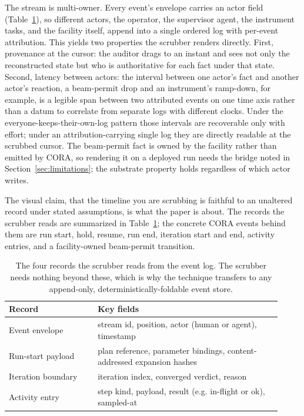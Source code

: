 The stream is multi-owner. Every event's envelope carries an actor field
(Table~\ref{tab:schema}), so different actors, the operator, the supervisor
agent, the instrument tasks, and the facility itself, append into a single
ordered log with per-event attribution. This yields two properties the scrubber
renders directly. First, provenance at the cursor: the auditor drags to an
instant and sees not only the reconstructed state but who is authoritative for
each fact under that state. Second, latency between actors: the interval between
one actor's fact and another actor's reaction, a beam-permit drop and an
instrument's ramp-down, for example, is a legible span between two attributed
events on one time axis rather than a datum to correlate from separate logs with
different clocks. Under the everyone-keeps-their-own-log pattern those intervals
are recoverable only with effort; under an attribution-carrying single log they
are directly readable at the scrubbed cursor. The beam-permit fact is owned by
the facility rather than emitted by CORA, so rendering it on a deployed run needs
the bridge noted in Section~\ref{sec:limitations}; the substrate property holds
regardless of which actor writes.

The visual claim, that the timeline you are scrubbing is faithful to an
unaltered record under stated assumptions, is what the paper is about. The
records the scrubber reads are summarized in Table~\ref{tab:schema}; the
concrete CORA events behind them are run start, hold, resume, run end, iteration
start and end, activity entries, and a facility-owned beam-permit transition.

\begin{table}[t]
  \centering
  \caption{The four records the scrubber reads from the event log. The scrubber
  needs nothing beyond these, which is why the technique transfers to any
  append-only, deterministically-foldable event store.}
  \label{tab:schema}
  \footnotesize
  \begin{tabular}{@{}p{0.30\linewidth}p{0.62\linewidth}@{}}
    \toprule
    \textbf{Record} & \textbf{Key fields} \\
    \midrule
    Event envelope & stream id, position, actor (human or agent), timestamp \\[0.3em]
    Run-start payload & plan reference, parameter bindings, content-addressed
      expansion hashes \\[0.3em]
    Iteration boundary & iteration index, converged verdict, reason \\[0.3em]
    Activity entry & step kind, payload, result (e.g. in-flight or ok),
      sampled-at \\
    \bottomrule
  \end{tabular}
\end{table}

